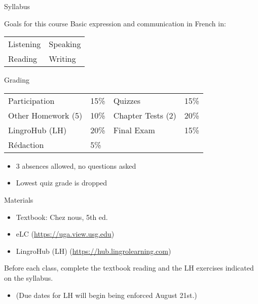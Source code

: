 \begin{frame}
  \begin{center}
    \Huge{Syllabus}
  \end{center}
\end{frame}

\begin{frame}{Goals for this course}
  Basic expression and communication in French in:
  \begin{center}
    \begin{tabular}{l l}
      Listening & Speaking \\
      Reading   & Writing \\
    \end{tabular}
  \end{center}
\end{frame}

\begin{frame}{Grading}
  \begin{center}
    \begin{tabular}{l l | l l}
      Participation      & 15\% & Quizzes           & 15\% \\
      Other Homework (5) & 10\% & Chapter Tests (2) & 20\% \\
      LingroHub (LH)     & 20\% & Final Exam        & 15\% \\
      Rédaction          & 5\%  &                   &
    \end{tabular}
  \end{center}
  \begin{itemize}
    \item 3 absences allowed, no questions asked
    \item Lowest quiz grade is dropped
  \end{itemize}
\end{frame}

\begin{frame}{Materials}
  \begin{itemize}
    \item Textbook: Chez nous, 5th ed.
    \item eLC (\url{https://uga.view.usg.edu})
    \item LingroHub (LH) (\url{https://hub.lingrolearning.com})
  \end{itemize}
  \alert{Before each class}, complete the textbook reading and the LH exercises indicated on the syllabus.
  \begin{itemize}
    \item (Due dates for LH will begin being enforced August 21st.)
  \end{itemize}
\end{frame}

